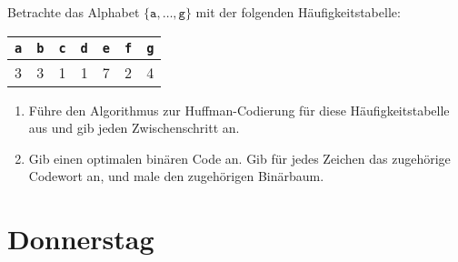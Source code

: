 \documentclass{uebung_cs}
\begin{document}
\begin{aufgabe}
    Betrachte das Alphabet $\{\texttt{a},\dots,\texttt{g}\}$ mit der folgenden Häufigkeitstabelle:
	\begin{center}
		\begin{tabular}{ccccccc}
			\texttt{a}&\texttt{b}&\texttt{c}&\texttt{d}&\texttt{e}&\texttt{f}&\texttt{g}\\\hline
			3&3&1&1&7&2&4\\
		\end{tabular}
	\end{center}
    \begin{enumerate}
        \item Führe den Algorithmus zur Huffman-Codierung für diese Häufigkeitstabelle aus und gib jeden Zwischenschritt an.
        \item Gib einen optimalen binären Code an. Gib für jedes Zeichen das zugehörige Codewort an, und male den zugehörigen Binärbaum.
    \end{enumerate}
\end{aufgabe}


\section*{Donnerstag}
\begin{aufgabe}
\end{aufgabe}
\end{document}
